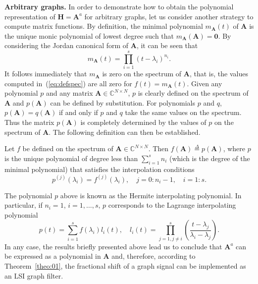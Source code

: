 \noindent\textbf{Arbitrary graphs.} In order to demonstrate how to obtain the polynomial representation of $\mathbf{H}=\mathbf{A}^a$ for arbitrary graphs, let us consider another strategy to compute matrix functions. By definition, the minimal polynomial $m_{\mathbf{A}}(t)$ of $\mathbf{A}$ is the unique monic polynomial of lowest degree such that $m_{\mathbf{A}}(\mathbf{A})=\mathbf{0}$. By considering the Jordan canonical form of $\mathbf{A}$, it can be seen that
\begin{equation}
m_{\mathbf{A}}(t)=\prod_{i=1}^s (t-\lambda_i)^{n_i}.
\end{equation}
It follows immediately that $m_{\mathbf{A}}$ is zero on the spectrum of $\mathbf{A}$, that is, the values computed in~(\ref{eq:defspec}) are all zero for $f(t)=m_{\mathbf{A}}(t)$. Given any polynomial $p$ and any matrix $\mathbf{A}\in\mathbb{C}^{N\times N}$, $p$ is clearly defined on the spectrum of $\mathbf{A}$ and $p(\mathbf{A})$ can be defined by substitution. For polynomials $p$ and $q$, $p(\mathbf{A})=q(\mathbf{A})$ if and only if $p$ and $q$ take the same values on the spectrum. Thus the matrix $p(\mathbf{A})$ is completely determined by the values of $p$ on the spectrum of $\mathbf{A}$. The following definition can then be established.
\vspace{0.2cm}
\begin{definition}\label{def:jc02}
Let $f$ be defined on the spectrum of $\mathbf{A}\in\mathbb{C}^{N\times N}$. Then $f(\mathbf{A})\overset{\Delta}{=}p(\mathbf{A})$, where $p$ is the unique polynomial of degree less than $\sum_{i=1}^s n_i$ (which is the degree of the minimal polynomial) that satisfies the interpolation conditions
\begin{equation}
    p^{(j)}(\lambda_i)=f^{(j)}(\lambda_i),\quad j=0:n_i-1,\quad i=1:s.
\end{equation}
\end{definition}

The polynomial $p$ above is known as the Hermite interpolating polynomial. In particular, if $n_i=1$, $i=1,\ldots,s$, $p$ corresponds to the Lagrange interpolating polynomial
\begin{equation}
    p(t)=\sum_{i=1}^s f(\lambda_i)l_i(t),\quad l_i(t)=\prod_{j=1,j\neq i}^s \left(\frac{t-\lambda_j}{\lambda_i-\lambda_j}\right).
\end{equation}
In any case, the results briefly presented above lead us to conclude that $\mathbf{A}^a$ can be expressed as a polynomial in $\mathbf{A}$ and, therefore, according to Theorem~\ref{theo:01}, the fractional shift of a graph signal can be implemented as an LSI graph filter.

